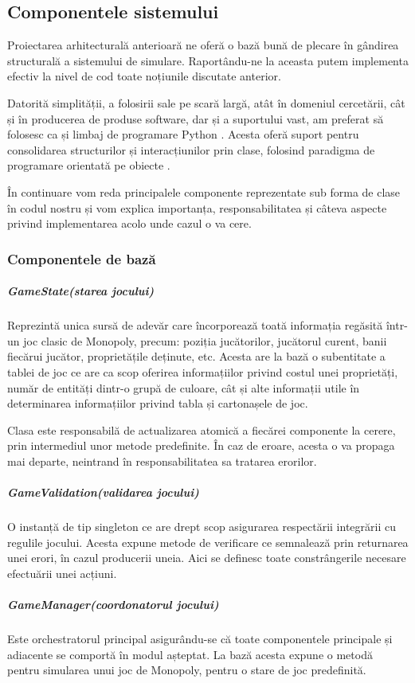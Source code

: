 \subsection{Componentele sistemului}
Proiectarea arhitecturală anterioară ne oferă o bază bună de plecare în gândirea structurală a sistemului de simulare. Raportându-ne la aceasta putem implementa efectiv la nivel de cod toate noțiunile discutate anterior.

Datorită simplității, a folosirii sale pe scară largă, atât în domeniul cercetării, cât și în producerea de produse software, dar și a suportului vast, am preferat să folosesc ca și limbaj de programare Python \cite{python_org}. Acesta oferă suport pentru consolidarea structurilor și interacțiunilor prin clase, folosind paradigma de programare orientată pe obiecte \cite{geeksforgeeks_oops}.

În continuare vom reda principalele componente reprezentate sub forma de clase în codul nostru și vom explica importanța, responsabilitatea și câteva aspecte privind implementarea acolo unde cazul o va cere.

\subsubsection{Componentele de bază}
\subparagraph{GameState(starea jocului)}\label{game-state}
Reprezintă unica sursă de adevăr care încorporează toată informația regăsită într-un joc clasic de Monopoly, precum: poziția jucătorilor, jucătorul curent, banii fiecărui jucător, proprietățile deținute, etc. Acesta are la bază o subentitate a tablei de joc ce are ca scop oferirea informațiilor privind costul unei proprietăți, număr de entități dintr-o grupă de culoare, cât și alte informații utile în determinarea informațiilor privind tabla și cartonașele de joc.

Clasa este responsabilă de actualizarea atomică a fiecărei componente la cerere, prin intermediul unor metode predefinite. În caz de eroare, acesta o va propaga mai departe, neintrand în responsabilitatea sa tratarea erorilor.
\subparagraph{GameValidation(validarea jocului)}
O instanță de tip singleton \cite{geeksforgeeks_singleton} ce are drept scop asigurarea respectării integrării cu regulile jocului. Acesta expune metode de verificare ce semnalează prin returnarea unei erori, în cazul producerii uneia. Aici se definesc toate constrângerile necesare efectuării unei acțiuni.
\subparagraph{GameManager(coordonatorul jocului)}
Este orchestratorul principal asigurându-se că toate componentele principale și adiacente se comportă în modul așteptat. La bază acesta expune o metodă pentru simularea unui joc de Monopoly, pentru o stare de joc predefinită.

